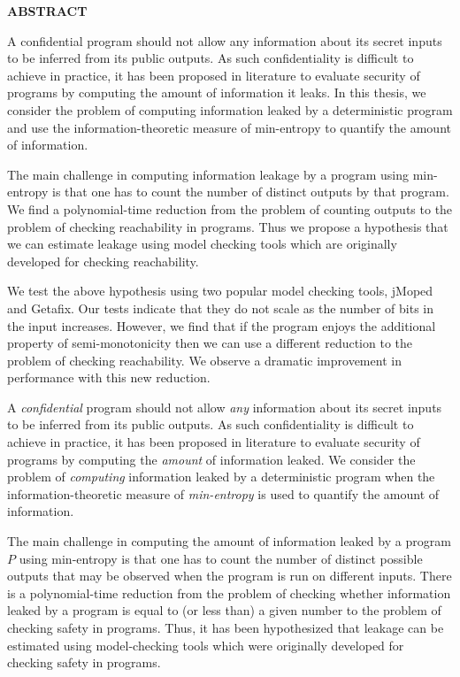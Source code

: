 \newpage
{}

\centerline{\bf \large ABSTRACT}
\vskip 10mm 

A confidential program should not allow any information about its secret inputs to be inferred from its public outputs. As such confidentiality is difficult to achieve in practice, it has been proposed in literature to evaluate security of programs by computing the amount of information it leaks. In this thesis, we consider the problem of computing information leaked by a deterministic program and use the information-theoretic measure of min-entropy to quantify the amount of information.

The main challenge in computing information leakage by a program using min-entropy is that one has to count the number of distinct outputs by that program. We find a polynomial-time reduction from the problem of counting outputs to the problem of checking reachability in programs. Thus we propose a hypothesis that we can estimate leakage using model checking tools which are originally developed for checking reachability.

We test the above hypothesis using two popular model checking tools, jMoped and Getafix. Our tests indicate that they do not scale as the number of bits in the input increases. However, we find that if the program enjoys the additional property of semi-monotonicity then we can use a different reduction to the problem of checking reachability. We observe a dramatic improvement in performance with this new reduction.

\iffalse

A \emph{confidential} program should not allow \emph{any} information about its secret inputs to be inferred from its public outputs.  As such confidentiality is difficult to achieve in practice, it has been proposed in literature to evaluate security of programs by computing the \emph{amount} of information leaked. %
We consider the problem of \emph{computing} 
information leaked by a deterministic  program  when the information-theoretic measure of \emph{min-entropy} is used to quantify the amount of information. 

The main challenge in computing the amount of  information leaked by a program $P$ using min-entropy is that one has to count the number of distinct possible outputs that may be observed when the program is run on different inputs. There is a polynomial-time reduction from the problem of checking whether information leaked by a program is equal to  (or less than) a given number to the problem of checking safety in  programs.  Thus, %
it has been hypothesized that leakage can be estimated using model-checking tools which were  originally developed for checking safety in programs.  
 
